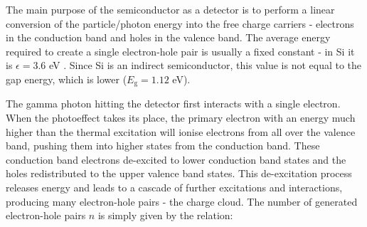 \par
The main purpose of the semiconductor as a detector is to perform a linear conversion of the particle/photon energy into the free charge carriers - electrons in the conduction band and holes in the valence band. The average energy required to create a single electron-hole pair is usually a fixed constant - in Si it is $\epsilon = 3.6$ eV \cite{Lutz_2007}. Since Si is an indirect semiconductor, this value is not equal to the gap energy, which is lower ($E_{\textrm{g}} = 1.12$ eV).  

\par
The gamma photon hitting the detector first interacts with a single electron. When the photoeffect takes its place, the primary electron with an energy much higher than the thermal excitation will ionise electrons from all over the valence band, pushing them into higher states from the conduction band. These conduction band electrons de-excited to lower conduction band states and the holes redistributed to the upper valence band states. This de-excitation process releases energy and leads to a cascade of further excitations and interactions, producing many electron-hole pairs - the charge cloud. The number of generated electron-hole pairs $n$ is simply given by the relation:
%
%


